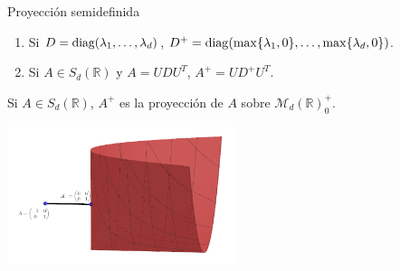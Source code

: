 \documentclass[10pt, compress]{beamer}
\newcommand\R{\mathbb{R}}
\begin{document}
\begin{frame}{Proyección semidefinida}
  \begin{definition}
    \begin{enumerate}
      \item Si $D = \operatorname{diag}(\lambda_1,\dots,\lambda_d)$, $D^+ = \operatorname{diag}(\max\{\lambda_1,0\},\dots,\max\{\lambda_d,0\})$.
      \item Si $A \in S_d(\R)$ y $A = UDU^T$, $A^+ = UD^+U^T$.
    \end{enumerate}
  \end{definition}

  \begin{theorem}
    Si $A \in S_d(\R)$, $A^+$ es la proyección de $A$ sobre $\mathcal{M}_d(\R)^+_0$.
  \end{theorem}

  \centering\includegraphics[width=0.5\textwidth]{images/sdp.png}

\end{frame}

\end{document}
